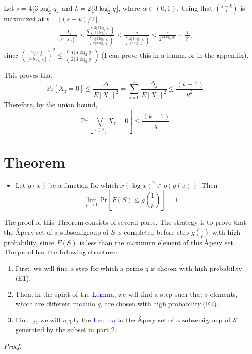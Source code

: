 Let $s = 4\lfloor 3 \log_2 q \rfloor$ and $k = 2\lfloor 3 \log_2 q \rfloor$, where $\alpha \in (0, 1)$. Using that ${s - k \choose t}$ is maximized at $t = \lfloor (s - k) / 2\rfloor$,
\begin{align*}
\frac{\Delta_j}{E[X_z]^2} \leq \frac{q {2\lfloor 3 \log_2 q\rfloor\choose \lfloor 3 \log_2 q \rfloor}}{{4\lfloor 3\log_2 q \rfloor \choose 2\lfloor 3\log_2 q \rfloor}} \leq \frac{q}{{2\lfloor 3 \log_2 q \rfloor \choose \lfloor 3 \log_2 q \rfloor}} \leq \frac{q}{2^{\lfloor 3 \log_2 q \rfloor}} \sim \frac{1}{q^2},
\end{align*}
since \({2\lfloor q^{\alpha} \rfloor \choose \lfloor 3 \log_2 q \rfloor}^2 \leq {4\lfloor 3 \log_2 q \rfloor \choose 2\lfloor 3 \log_2 q \rfloor}\) (I can prove this in a lemma or in the appendix).   \par
This proves that
\[\text{Pr}[X_z = 0] \leq \frac{\Delta}{E[X_z]^2} = \sum_{j = 0}^k \frac{\Delta_j}{E[X_z]^2} \leq \frac{(k + 1)}{q^2}.\]
Therefore, by the union bound,
\[\text{Pr}[\bigvee_{z \in \mathbb{Z}_q} X_z = 0] \leq \frac{(k + 1)}{q}.\]

\section{Theorem} 
\begin{itemize}
    \item Let $g(x)$ be a function for which $x(\log x)^2 \in o(g(x))$ .Then
\[\lim_{p \to 0}\text{Pr}\left[F(S) \leq g\left(\frac{1}{p}\right)\right] = 1.\] 
\end{itemize}

\par The proof of this Theorem consists of several parts. The strategy is to prove that the Ápery set of a subsemigroup of $S$ is completed before step $g\left(\frac{1}{p}\right)$ with high probability, since $F(S)$ is less than the maximum element of this Ápery set. The proof has the following structure: 
\begin{enumerate}
\item First, we will find a step for which a prime $q$ is chosen with high probability (E1). 
\item Then, in the spirit of the \textcolor{blue}{Lemma}, we will find a step such that $s$ elements, which are different modulo $q$, are chosen with high probability (E2). 
\item Finally, we will apply the \textcolor{blue}{Lemma} to the Ápery set of a subsemigroup of $S$ generated by the subset in part 2. 
\end{enumerate}
\textit{Proof. }
